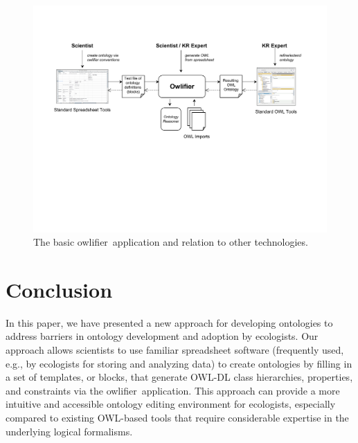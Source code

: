 \documentclass[preprint,number]{elsarticle}
\newcommand{\owlifier}{\textsf{owlifier}}
\begin{document}
\begin{figure}
  \centering
  \includegraphics[scale=.5]{architecture.pdf}
  \caption{The basic \owlifier\ application and relation to other
    technologies.}
  \label{fig:owlifier}
\end{figure}

\section{Conclusion}
\label{sec:conclusion}

In this paper, we have presented a new approach for developing
ontologies to address barriers in ontology development and adoption by
ecologists. Our approach allows scientists to use familiar spreadsheet
software (frequently used, e.g., by ecologists for storing and
analyzing data) to create ontologies by filling in a set of templates,
or blocks, that generate OWL-DL class hierarchies, properties, and
constraints via the \owlifier\ application.  This approach can provide
a more intuitive and accessible ontology editing environment for
ecologists, especially compared to existing OWL-based tools that
require considerable expertise in the underlying logical formalisms.
\end{document}
